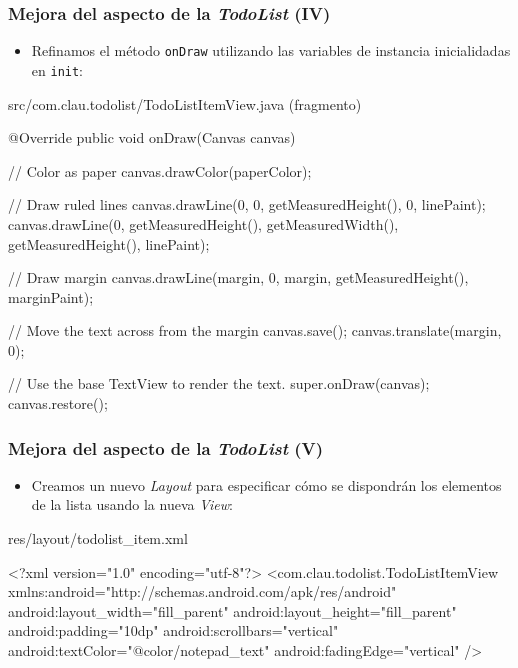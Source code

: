 \documentclass[hyperref={pdfpagelabels=true},ucs]{beamer}
\begin{document}
\begin{frame}[fragile]
\frametitle{Mejora del aspecto de la \emph{TodoList} (IV)}

\begin{itemize}
\item Refinamos el método \verb|onDraw| utilizando las variables de
  instancia inicialidadas en \verb|init|:
\end{itemize}

\begin{tiny}
\begin{block}{src/com.clau.todolist/TodoListItemView.java (fragmento)}
\begin{java}
  @Override
  public void onDraw(Canvas canvas) {
    // Color as paper
    canvas.drawColor(paperColor);

    // Draw ruled lines
    canvas.drawLine(0, 0, getMeasuredHeight(), 0, linePaint);
    canvas.drawLine(0, getMeasuredHeight(),
    getMeasuredWidth(), getMeasuredHeight(),
    linePaint);

    // Draw margin
    canvas.drawLine(margin, 0, margin, getMeasuredHeight(), marginPaint);

    // Move the text across from the margin
    canvas.save();
    canvas.translate(margin, 0);
  
    // Use the base TextView to render the text.
    super.onDraw(canvas);
    canvas.restore();
  }
\end{java}
\end{block}
\end{tiny}

\end{frame}



\begin{frame}[fragile]
\frametitle{Mejora del aspecto de la \emph{TodoList} (V)}

\begin{itemize}
\item Creamos un nuevo \emph{Layout} para especificar cómo se
  dispondrán los elementos de la lista usando la nueva \emph{View}:
\end{itemize}

\begin{tiny}
\begin{block}{res/layout/todolist\_item.xml}
\begin{xml}
<?xml version="1.0" encoding="utf-8"?>
<com.clau.todolist.TodoListItemView
   xmlns:android="http://schemas.android.com/apk/res/android"
   android:layout_width="fill_parent"
   android:layout_height="fill_parent"
   android:padding="10dp"
   android:scrollbars="vertical"
   android:textColor="@color/notepad_text"
   android:fadingEdge="vertical"
/>
\end{xml}
\end{block}
\end{tiny}

\end{frame}
\end{document}
